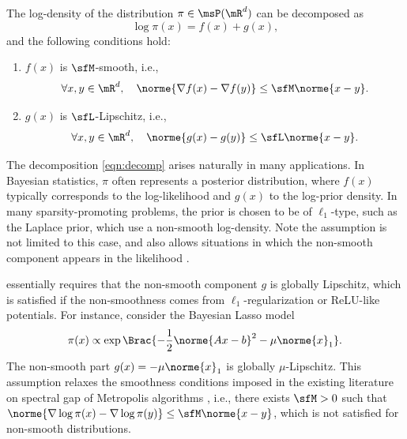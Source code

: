 \documentclass[11pt]{article}
\begin{document}
\begin{asm}
\label{asm:smth}
The log-density of the distribution $\pi \in\msP(\mR^d)$ can be decomposed as
\begin{equation}
\label{eqn:decomp}
    \log \pi(x) = f(x) + g(x),
\end{equation}
and the following conditions hold:
\begin{enumerate}[1.]
    \item $f(x)$ is $\sfM$-smooth, i.e.,
    \begin{equation}
    \label{eqn:Msmooth}
        \forall x,y\in\mR^d, \quad \norme{ \nabla f(x) - \nabla f(y) } \le \sfM \norme{x-y}.
    \end{equation}
    \item $ g(x)$ is $\sfL$-Lipschitz, i.e.,
    \begin{equation}
    \label{eqn:LLip}
        \forall x,y\in\mR^d, \quad \norme{ g(x) - g(y) } \le \sfL \norme{x-y}.
    \end{equation}
\end{enumerate}
\end{asm}

The decomposition \eqref{eqn:decomp} arises naturally in many applications.
In Bayesian statistics, $\pi$ often represents a posterior distribution, where $f(x)$ typically corresponds to the log-likelihood and $g(x)$ to the log-prior density.
In many sparsity-promoting problems, the prior is chosen to be of $\ell_1$-type, such as the Laplace prior, which use a non-smooth log-density.
Note the assumption is not limited to this case, and also allows situations in which the non-smooth component appears in the likelihood \citep{MR1861390}.


 essentially requires that the non-smooth component $g$ is globally Lipschitz, which is satisfied if the non-smoothness comes from $\ell_1$-regularization or ReLU-like potentials. 
For instance, consider the Bayesian Lasso model
\begin{equation}
    \pi(x) \propto \exp \Brac{ - \frac{1}{2}\norme{Ax-b}^2 - \mu \norme{x}_1 }. 
\end{equation}
The non-smooth part $g(x) = -\mu \norme{x}_1$ is globally $\mu$-Lipschitz.
%
This assumption relaxes the smoothness conditions imposed in the existing literature on spectral gap of Metropolis algorithms \citep{pmlr-v75-dwivedi18a,JMLR:v23:21-1184,24-AAP2058}, i.e., there exists $\sfM>0$ such that $ \norme{ \nabla \log \pi (x) - \nabla \log \pi(y) } \le \sfM \norme{x-y}$, which is not satisfied for non-smooth distributions.
\end{document}
